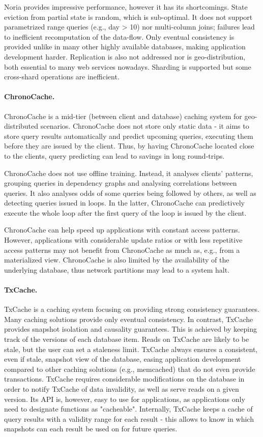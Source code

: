 Noria provides impressive performance, however it has its shortcomings.
State eviction from partial state is random, which is sub-optimal.
It does not support parametrized range queries (e.g., day > 10) nor multi-column joins; failures lead to inefficient recomputation of the data-flow.
Only eventual consistency is provided unlike in many other highly available databases, making application development harder.
Replication is also not addressed nor is geo-distribution, both essential to many web services nowadays.
Sharding is supported but some cross-shard operations are inefficient.

\paragraph{ChronoCache.} ChronoCache \cite{chronocache} is a mid-tier (between client and database) caching system for geo-distributed scenarios.
ChronoCache does not store only static data - it aims to store query results automatically and predict upcoming queries, executing them before they are issued by the client.
Thus, by having ChronoCache located close to the clients, query predicting can lead to savings in long round-trips.

ChronoCache does not use offline training.
Instead, it analyses clients' patterns, grouping queries in dependency graphs and analysing correlations between queries.
It also analyses odds of some queries being followed by others, as well as detecting queries issued in loops.
In the latter, ChronoCache can predictively execute the whole loop after the first query of the loop is issued by the client.

ChronoCache can help speed up applications with constant access patterns.
However, applications with considerable update ratios or with less repetitive access patterns may not benefit from ChronoCache as much as, e.g., from a materialized view.
ChronoCache is also limited by the availability of the underlying database, thus network partitions may lead to a system halt.

\paragraph{TxCache.} TxCache \cite{txcache} is a caching system focusing on providing strong consistency guarantees.
Many caching solutions provide only eventual consistency.
In contrast, TxCache provides snapshot isolation and causality guarantees.
This is achieved by keeping track of the versions of each database item.
Reads on TxCache are likely to be stale, but the user can set a staleness limit.
TxCache always ensures a consistent, even if stale, snapshot view of the database, easing application development compared to other caching solutions (e.g., memcached) that do not even provide transactions.
TxCache requires considerable modifications on the database in order to notify TxCache of data invalidity, as well as serve reads on a given version. Its API is, however, easy to use for applications, as applications only need to designate functions as "cacheable".
Internally, TxCache keeps a cache of query results with a validity range for each result - this allows to know in which snapshots can each result be used on for future queries.

